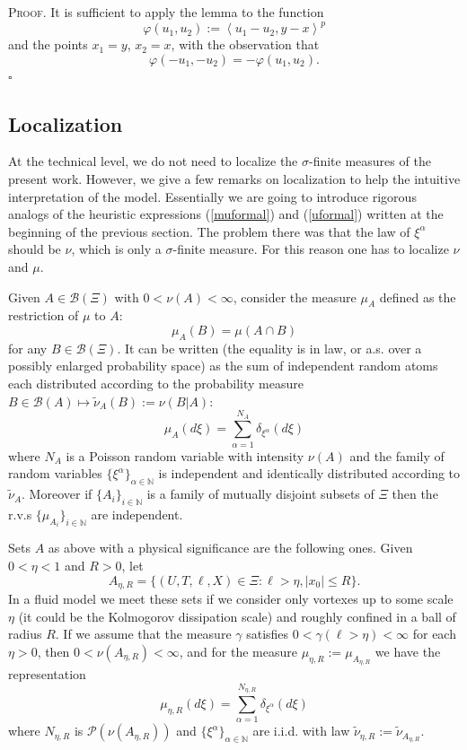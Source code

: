 \documentclass[a4paper,12pt]{article}
\begin{document}
\textsc{Proof.}\hspace{0.3cm} It is sufficient to apply the lemma to the
function
\[
\varphi\left(  u_{1},u_{2}\right)  :=\left\langle u_{1}-u_{2},y-x\right\rangle
^{p}%
\]
and the points $x_{1}=y$, $x_{2}=x$, with the observation that
\[
\varphi\left(  -u_{1},-u_{2}\right)  =-\varphi\left(  u_{1},u_{2}\right)  .
\]
\hfill$\square$

\subsection{Localization\label{sectlocalizz}}

At the technical level, we do not need to localize the $\sigma$-finite
measures of the present work. However, we give a few remarks on localization
to help the intuitive interpretation of the model. Essentially we are going to
introduce rigorous analogs of the heuristic expressions (\ref{muformal}) and
(\ref{uformal}) written at the beginning of the previous section. The problem
there was that the law of $\xi^{\alpha}$ should be $\nu$, which is only a
$\sigma$-finite measure. For this reason one has to localize $\nu$ and $\mu$.

Given $A\in\mathcal{B}\left(  \Xi\right)  $ with $0<\nu\left(  A\right)
<\infty$, consider the measure $\mu_{A}$ defined as the restriction of $\mu$
to $A$:
\[
\mu_{A}\left(  B\right)  =\mu\left(  A\cap B\right)
\]
for any $B\in\mathcal{B}\left(  \Xi\right)  $. It can be written (the equality
is in law, or a.s. over a possibly enlarged probability space) as the sum of
independent random atoms each distributed according to the probability measure
$B\in\mathcal{B}\left(  A\right)  \mapsto\widetilde{\nu}_{A}\left(  B\right)
:=\nu(B|A)$:
\[
\mu_{A}(d\xi)=\sum_{\alpha=1}^{N_{A}}\delta_{\xi^{\alpha}}(d\xi)
\]
where $N_{A}$ is a Poisson random variable with intensity $\nu(A)$ and the
family of random variables $\{\xi^{\alpha}\}_{\alpha\in\mathbb{N}}$ is
independent and identically distributed according to $\widetilde{\nu}_{A}$.
Moreover if $\{A_{i}\}_{i\in\mathbb{N}}$ is a family of mutually disjoint
subsets of $\Xi$ then the r.v.s $\{\mu_{A_{i}}\}_{i\in\mathbb{N}}$ are independent.

Sets $A$ as above with a physical significance are the following ones. Given
$0<\eta<1$ and $R>0$, let
\[
A_{\eta,R}=\{(U,T,\ell,X)\in\Xi:\ell>\eta,|x_{0}|\leq R\}.
\]
In a fluid model we meet these sets if we consider only vortexes up to some
scale $\eta$ (it could be the Kolmogorov dissipation scale) and roughly
confined in a ball of radius $R$. If we assume that the measure $\gamma$
satisfies $0<\gamma(\ell>\eta)<\infty$ for each $\eta>0$, then $0<\nu\left(
A_{\eta,R}\right)  <\infty$, and for the measure $\mu_{\eta,R}:=\mu
_{A_{\eta,R}}$ we have the representation
\[
\mu_{\eta,R}(d\xi)=\sum_{\alpha=1}^{N_{\eta,R}}\delta_{\xi^{\alpha}}(d\xi)
\]
where $N_{\eta,R}$ is $\mathcal{P}\left(  \nu(A_{\eta,R})\right)  $ and
$\{\xi^{\alpha}\}_{\alpha\in\mathbb{N}}$ are i.i.d. with law $\widetilde{\nu
}_{\eta,R}:=\widetilde{\nu}_{A_{\eta,R}}$.
\end{document}
